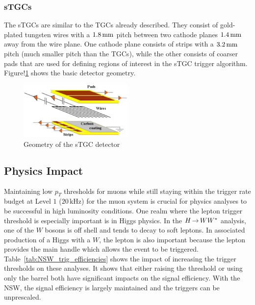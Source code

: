 \subsubsection{sTGCs}

The sTGCs are similar to the TGCs already described. They consist of gold-plated tungsten wires with a $1.8\,\rm mm$ pitch between two cathode planes $1.4\, \rm mm$ away from the wire plane. One cathode plane consists of strips with a $3.2\,\rm mm$ pitch (much smaller pitch than the TGCs), while the other consists of coarser pads that are used for defining regions of interest in the sTGC trigger algorithm. Figure!\ref{fig:stgc} shows the basic detector geometry. 

\begin{figure}[h!]
  \centering
  \captionsetup{justification=centering}

  \includegraphics[width=0.5\textwidth]{figures/stgc}
   \caption{Geometry of the sTGC detector~\cite{NSW_TDR}}
  \label{fig:stgc}
\end{figure}

\subsection{Physics Impact}

Maintaining low $p_{T}$ thresholds for muons while still staying within the trigger rate budget at Level $1$ ($20\,\textrm{kHz}$) for the muon system is crucial for physics analyses to be successful in high luminosity conditions. One realm where the lepton trigger threshold is especially important is in Higgs physics. In the $H{\,{\rightarrow}\,}WW^\ast$ analysis, one of the $W$ bosons is off shell and tends to decay to soft leptons. In associated production of a Higgs with a $W$, the lepton is also important because the lepton provides the main handle which allows the event to be triggered. Table~\ref{tab:NSW_trig_efficiencies} shows the impact of increasing the trigger thresholds on these analyses. It shows that either raising the threshold or using only the barrel both have significant impacts on the signal efficiency. With the NSW, the signal efficiency is largely maintained and the triggers can be unprescaled.


